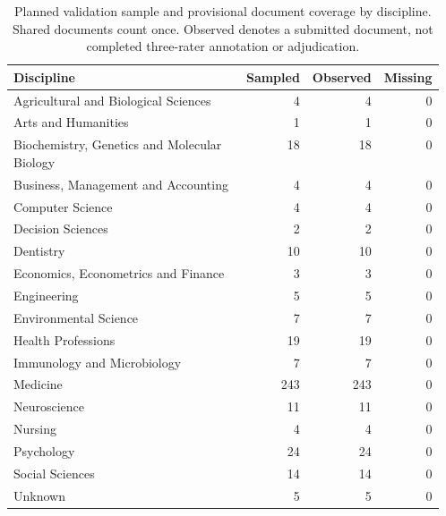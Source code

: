 \begin{table}[t]
\centering
\caption{Planned validation sample and provisional document coverage by discipline. Shared documents count once. Observed denotes a submitted document, not completed three-rater annotation or adjudication.}
\begin{tabular}{p{0.56\linewidth}rrr}
\toprule
Discipline & Sampled & Observed & Missing \\
\midrule
Agricultural and Biological Sciences & 4 & 4 & 0 \\
Arts and Humanities & 1 & 1 & 0 \\
Biochemistry, Genetics and Molecular Biology & 18 & 18 & 0 \\
Business, Management and Accounting & 4 & 4 & 0 \\
Computer Science & 4 & 4 & 0 \\
Decision Sciences & 2 & 2 & 0 \\
Dentistry & 10 & 10 & 0 \\
Economics, Econometrics and Finance & 3 & 3 & 0 \\
Engineering & 5 & 5 & 0 \\
Environmental Science & 7 & 7 & 0 \\
Health Professions & 19 & 19 & 0 \\
Immunology and Microbiology & 7 & 7 & 0 \\
Medicine & 243 & 243 & 0 \\
Neuroscience & 11 & 11 & 0 \\
Nursing & 4 & 4 & 0 \\
Psychology & 24 & 24 & 0 \\
Social Sciences & 14 & 14 & 0 \\
Unknown & 5 & 5 & 0 \\
\bottomrule
\end{tabular}
\label{tab:validation-sample}
\end{table}
